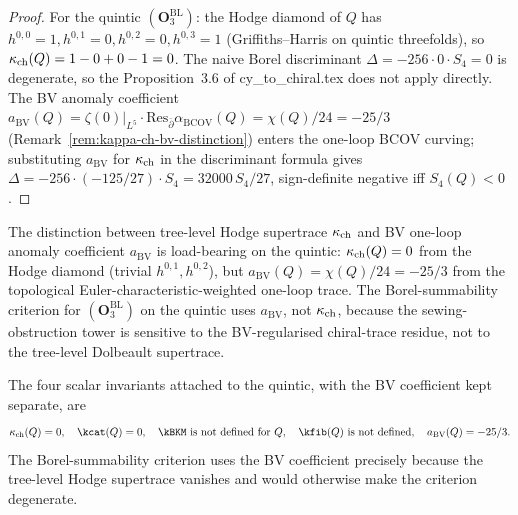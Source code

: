 \begin{proof}
For the quintic $(\mathbf{O}_3^{\mathrm{BL}})$: the Hodge diamond of
$Q$ has $h^{0, 0} = 1, h^{0, 1} = 0, h^{0, 2} = 0, h^{0, 3} = 1$
(Griffiths--Harris on quintic threefolds), so
$\kappa_{\mathrm{ch}}(Q) = 1 - 0 + 0 - 1 = 0$. The naive Borel discriminant
$\Delta = -256 \cdot 0 \cdot S_4 = 0$ is degenerate, so the
Proposition~$3.6$ of cy\_to\_chiral.tex does not apply directly.
The BV anomaly coefficient
$a_{\mathrm{BV}}(Q) = \zeta(0)\big|_{L^5} \cdot \mathrm{Res}_{\bar\partial}
\alpha_{\mathrm{BCOV}}(Q) = \chi(Q)/24 = -25/3$
(Remark~\ref{rem:kappa-ch-bv-distinction}) enters the one-loop
BCOV curving; substituting $a_{\mathrm{BV}}$ for $\kappa_{\mathrm{ch}}$ in the
discriminant formula gives
$\Delta = -256 \cdot (-125/27) \cdot S_4 = 32000\, S_4/27$,
sign-definite negative iff $S_4(Q) < 0$.
\end{proof}

\begin{remark}
\label{rem:kch-vs-kchBV-quintic-sharpened}
The distinction between tree-level Hodge supertrace $\kappa_{\mathrm{ch}}$ and
BV one-loop anomaly coefficient $a_{\mathrm{BV}}$ is load-bearing on the
quintic: $\kappa_{\mathrm{ch}}(Q) = 0$ from the Hodge diamond (trivial
$h^{0,1}, h^{0,2}$), but $a_{\mathrm{BV}}(Q) = \chi(Q)/24 = -25/3$ from the
topological Euler-characteristic-weighted one-loop trace. The
Borel-summability criterion for $(\mathbf{O}_3^{\mathrm{BL}})$ on
the quintic uses $a_{\mathrm{BV}}$, not $\kappa_{\mathrm{ch}}$, because the sewing-obstruction
tower is sensitive to the BV-regularised chiral-trace residue, not
to the tree-level Dolbeault supertrace.

The four scalar invariants attached to the quintic, with the BV coefficient
kept separate, are
\[
\kch(Q) = 0, \quad \kcat(Q) = 0, \quad \kBKM \text{ is not defined for } Q,
\quad \kfib(Q) \text{ is not defined},
\quad a_{\mathrm{BV}}(Q) = -25/3.
\]
The Borel-summability criterion uses the BV coefficient
precisely because the tree-level Hodge supertrace vanishes and would
otherwise make the criterion degenerate.
\end{remark}

